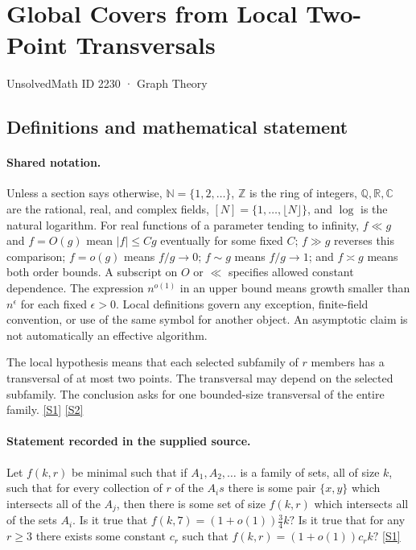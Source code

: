 \documentclass[11pt,a4paper]{article}
\newcommand{\N}{\mathbb{N}}
\newcommand{\Z}{\mathbb{Z}}
\newcommand{\Q}{\mathbb{Q}}
\newcommand{\R}{\mathbb{R}}
\newcommand{\C}{\mathbb{C}}
\newcommand{\sref}[2]{\hyperlink{source:#1:#2}{[S#2]}}
\begin{document}

\setcounter{section}{2229}

\section{Global Covers from Local Two-Point Transversals}\label{2230}

{\small\sffamily UnsolvedMath ID 2230 · Graph Theory}

\subsection{Definitions and mathematical statement}

\paragraph{Shared notation.}Unless a section says otherwise, $\N=\{1,2,\ldots\}$,
$\Z$ is the ring of integers, $\Q,\R,\C$ are the rational, real, and complex
fields, $[N]=\{1,\ldots,\lfloor N\rfloor\}$, and $\log$ is the natural
logarithm. For real functions of a parameter tending to infinity,
$f\ll g$ and $f=O(g)$ mean $|f|\leq Cg$ eventually for some fixed $C$;
$f\gg g$ reverses this comparison; $f=o(g)$ means $f/g\to0$;
$f\sim g$ means $f/g\to1$; and $f\asymp g$ means both order bounds.
A subscript on $O$ or $\ll$ specifies allowed constant dependence.
The expression $n^{o(1)}$ in an upper bound means growth smaller than
$n^\epsilon$ for each fixed $\epsilon>0$. Local definitions govern any
exception, finite-field convention, or use of the same symbol for another
object. An asymptotic claim is not automatically an effective algorithm.



The local hypothesis means that each selected subfamily of $r$ members has a transversal of at most two points. The transversal may depend on the selected subfamily. The conclusion asks for one bounded-size transversal of the entire family. \sref{2230}{1} \sref{2230}{2}

\paragraph{Statement recorded in the supplied source.}
Let $f(k,r)$ be minimal such that if $A_1,A_2,\ldots$ is a family of sets, all of size $k$, such that for every collection of $r$ of the $A_is$ there is some pair $\{x,y\}$ which intersects all of the $A_j$, then there is some set of size $f(k,r)$ which intersects all of the sets $A_i$. Is it true that $ f(k,7)=(1+o(1))\frac{3}{4}k? $ Is it true that for any $r\geq 3$ there exists some constant $c_r$ such that $ f(k,r)=(1+o(1))c_rk? $ \sref{2230}{1}
\end{document}
